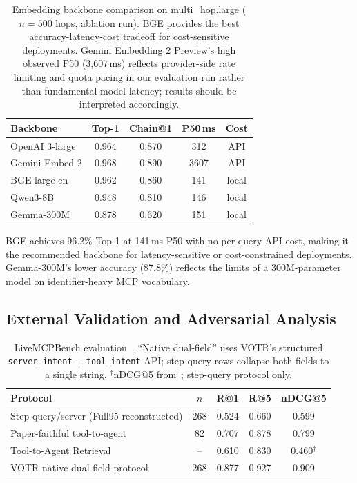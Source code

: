 \documentclass[sigconf,anonymous,review]{acmart}
\newcommand{\votr}{\textsc{VOTR}\xspace}
\begin{document}
\begin{table}[t]
\centering
\small
\caption{Embedding backbone comparison on multi\_hop.large ($n=500$ hops, ablation
run). BGE provides the best accuracy-latency-cost tradeoff for cost-sensitive
deployments. Gemini Embedding 2 Preview's high observed P50 (3,607\,ms) reflects
provider-side rate limiting and quota pacing in our evaluation run rather than
fundamental model latency; results should be interpreted accordingly.}
\label{tab:backbone}
\begin{tabular}{@{}lcccc@{}}
\toprule
Backbone & Top-1 & Chain@1 & P50\,ms & Cost \\
\midrule
OpenAI 3-large  & 0.964 & 0.870 & 312  & API \\
Gemini Embed 2  & 0.968 & 0.890 & 3607 & API \\
BGE large-en    & 0.962 & 0.860 & 141  & local \\
Qwen3-8B        & 0.948 & 0.810 & 146  & local \\
Gemma-300M      & 0.878 & 0.620 & 151  & local \\
\bottomrule
\end{tabular}
\end{table}

BGE achieves 96.2\% Top-1 at 141\,ms P50 with no per-query API cost, making it
the recommended backbone for latency-sensitive or cost-constrained deployments.
Gemma-300M's lower accuracy (87.8\%) reflects the limits of a 300M-parameter model
on identifier-heavy MCP vocabulary.

\subsection{External Validation and Adversarial Analysis}
\label{sec:external}

\begin{table}[t]
\centering
\scriptsize
\caption{LiveMCPBench evaluation~\cite{livemcpbench2025}. ``Native dual-field''
uses \votr's structured \texttt{server\_intent} + \texttt{tool\_intent} API;
step-query rows collapse both fields to a single string.
$^\dagger$nDCG@5 from~\cite{tool_to_agent_2025}; step-query protocol only.}
\label{tab:livemcp}
\begin{tabular}{@{}lcccc@{}}
\toprule
Protocol & $n$ & R@1 & R@5 & nDCG@5 \\
\midrule
Step-query/server (Full95 reconstructed)       & 268 & 0.524 & 0.660 & 0.599 \\
Paper-faithful tool-to-agent~\cite{tool_to_agent_2025} & 82 & 0.707 & 0.878 & 0.799 \\
Tool-to-Agent Retrieval~\cite{tool_to_agent_2025}      & --  & 0.610 & 0.830 & 0.460$^\dagger$ \\
\votr native dual-field protocol               & 268 & 0.877 & 0.927 & 0.909 \\
\bottomrule
\end{tabular}
\end{table}
\end{document}
